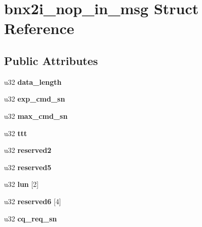 \hypertarget{structbnx2i__nop__in__msg}{
\section{bnx2i\_\-nop\_\-in\_\-msg Struct Reference}
\label{structbnx2i__nop__in__msg}
}
\subsection*{Public Attributes}
\begin{DoxyCompactItemize}
\item 
\hypertarget{structbnx2i__nop__in__msg_ad2dca363c767483b30d83c02e62ce113}{
u32 {\bfseries data\_\-length}}
\label{structbnx2i__nop__in__msg_ad2dca363c767483b30d83c02e62ce113}

\item 
\hypertarget{structbnx2i__nop__in__msg_a8d9ef14114b78491d9ecd86151f19b8b}{
u32 {\bfseries exp\_\-cmd\_\-sn}}
\label{structbnx2i__nop__in__msg_a8d9ef14114b78491d9ecd86151f19b8b}

\item 
\hypertarget{structbnx2i__nop__in__msg_a244d873d9d3e5240775577a15c693a9a}{
u32 {\bfseries max\_\-cmd\_\-sn}}
\label{structbnx2i__nop__in__msg_a244d873d9d3e5240775577a15c693a9a}

\item 
\hypertarget{structbnx2i__nop__in__msg_adb82cb4a6a4fc784a15072d8065d29d3}{
u32 {\bfseries ttt}}
\label{structbnx2i__nop__in__msg_adb82cb4a6a4fc784a15072d8065d29d3}

\item 
\hypertarget{structbnx2i__nop__in__msg_a46598c0335a39dbad09321b4b264eef3}{
u32 {\bfseries reserved2}}
\label{structbnx2i__nop__in__msg_a46598c0335a39dbad09321b4b264eef3}

\item 
\hypertarget{structbnx2i__nop__in__msg_afa34931796a833804b19cd739032e7ce}{
u32 {\bfseries reserved5}}
\label{structbnx2i__nop__in__msg_afa34931796a833804b19cd739032e7ce}

\item 
\hypertarget{structbnx2i__nop__in__msg_a30eaf35f713ada23406501b7abecbc93}{
u32 {\bfseries lun} \mbox{[}2\mbox{]}}
\label{structbnx2i__nop__in__msg_a30eaf35f713ada23406501b7abecbc93}

\item 
\hypertarget{structbnx2i__nop__in__msg_a4597de281d9631fc75e769d36683b81e}{
u32 {\bfseries reserved6} \mbox{[}4\mbox{]}}
\label{structbnx2i__nop__in__msg_a4597de281d9631fc75e769d36683b81e}

\item 
\hypertarget{structbnx2i__nop__in__msg_a80bf62bb3ea57cfd1a0592c3f4462724}{
u32 {\bfseries cq\_\-req\_\-sn}}
\label{structbnx2i__nop__in__msg_a80bf62bb3ea57cfd1a0592c3f4462724}

\end{DoxyCompactItemize}


